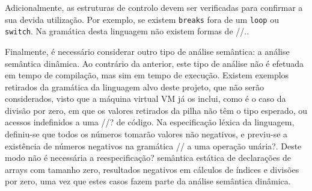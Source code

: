 Adicionalmente, as estruturas de controlo devem ser verificadas para confirmar
a sua devida utilização.  Por exemplo, se existem \texttt{breaks} fora de um
\texttt{loop} ou \texttt{switch}. Na gramática desta linguagem não existem
formas de //..

Finalmente, é necessário considerar outro tipo de análise semântica: a análise
semântica dinâmica.  Ao contrário da anterior, este tipo de análise não
é efetuada em tempo de compilação, mas sim em tempo de execução. Existem
exemplos retirados da gramática da linguagem alvo deste projeto, que não serão
considerados, visto que a máquina virtual VM já os inclui, como é o caso da
divisão por zero, em que os valores retirados da pilha não têm o tipo esperado,
ou acessos indefinidos a uma //? de código. Na especificação léxica da
linguagem, definiu-se que todos os números tomarão valores não negativos,
e previu-se a existência de números negativos na gramática // a uma operação
unária?.  Deste modo não é necessária a reespecificação? semântica estática de
declarações de arrays com tamanho zero, resultados negativos em cálculos de
índices e divisões por zero, uma vez que estes casos fazem parte da análise
semântica dinâmica.









